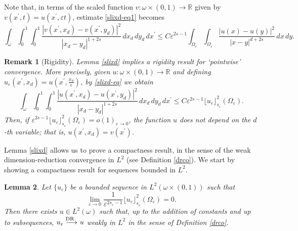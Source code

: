 \documentclass[11pt]{article}
\newtheorem{definition}{Definition}[section]
\newtheorem{lemma}[definition]{Lemma}
\newtheorem{remark}[definition]{Remark}
\def\e{\varepsilon}
\newcommand{\weak}{\rightharpoonup}
\begin{document}
Note that, in terms of the scaled function $v\colon\omega\times (0,1)\to \mathbb R$ given by 
$v(x^\prime, t)=u(x^\prime,\e t)$, estimate \eqref{slixd-eq1} becomes 
\begin{equation}\label{slixd-eq}
\int_\omega\int_0^1\int_0^1\frac{|v(x^\prime,x_d)-v(x^\prime,y_d)|^2}{|x_d-y_d|^{1+2s}}\, dx_d\, dy_d\, dx^\prime \leq C\e^{2s-1}\int_{\Omega_\e}\int_{\Omega_\e}\frac{|u(x)-u(y)|^2}{|x-y|^{d+2s}}  \, dx\, dy.
\end{equation}

\begin{remark}[Rigidity]\label{rigidity-rm}\rm 
Lemma \ref{slixd} implies a rigidity result for `pointwise' convergence.  
More precisely, given $u\colon\omega\times (0,1)\to\mathbb R$ and defining 
$u_\e(x^\prime,x_d)=u(x^\prime, \frac{x_d}{\e})$, 
by \eqref{slixd-eq} we obtain
$$\int_\omega\int_0^1\int_0^1 \frac{|u(x^\prime,x_d)-u(x^\prime,y_d)|^2}{|x_d-y_d|^{1+2s}}\, dx_d\, dy_d\, dx^\prime\leq C\e^{2s-1}\lfloor u_\e\rfloor_{s_\e}^2(\Omega_\e).$$ 
Then, if $\e^{2s-1}\lfloor u_\e\rfloor_{s_\e}^2(\Omega_\e)=o(1)_{\e\to 0}$, the function $u$ does not depend on the $d$-th variable; that is, $u(x^\prime,x_d)=v(x^\prime)$. 
\end{remark}

Lemma \ref{slixd} allows us to prove a compactness result, in the sense of the weak dimension-reduction convergence in $L^2$ (see Definition \ref{drco}). 
We start by showing a compactness result for sequences bounded in $L^2$. 

\begin{lemma}%
\label{compactness1}  
Let $\{u_\e\}$ be a bounded sequence in $L^2(\omega\times(0,1))$ such that 
$$\lim_{\e\to 0}\frac{1}{\e^{2s_\e-1}} \lfloor u_\e\rfloor_{s_\e}^2(\Omega_\e)=0.$$ 
Then
there exists $u\in L^2(\omega)$ such that, up to the addition of constants and up to subsequences, 
$u_\e\buildrel{\hbox {\rm\scriptsize DR }\, \, }\over{\longrightarrow} u$ weakly in $L^2$ in the sense of Definition {\rm \ref{drco}.} 
\end{lemma}
\end{document}
